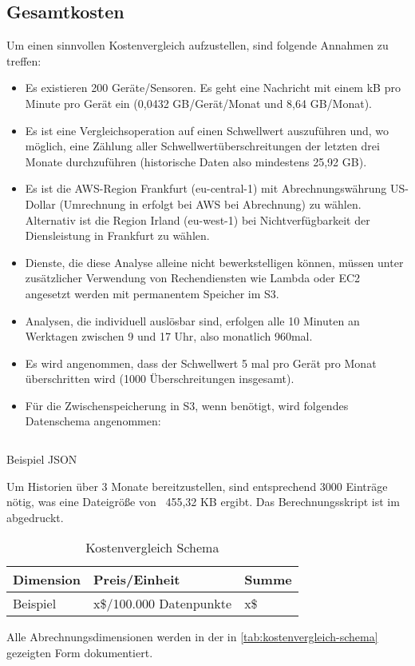 \subsection{Gesamtkosten}
Um einen sinnvollen Kostenvergleich aufzustellen, sind folgende Annahmen zu treffen:

\begin{itemize}
\item Es existieren 200 Geräte/Sensoren. Es geht eine Nachricht mit einem kB pro Minute pro Gerät ein (0,0432 GB/Gerät/Monat und 8,64 GB/Monat).
\item Es ist eine Vergleichsoperation auf einen Schwellwert auszuführen und, wo möglich, eine Zählung aller Schwellwertüberschreitungen der letzten drei Monate durchzuführen (historische Daten also mindestens 25,92 GB).  
\item Es ist die \ac{AWS}-Region Frankfurt (eu-central-1) mit Abrechnungswährung US-Dollar (Umrechnung in \texteuro{} erfolgt bei \ac{AWS} bei Abrechnung) zu wählen. Alternativ ist die Region Irland (eu-west-1) bei Nichtverfügbarkeit der Diensleistung in Frankfurt zu wählen. 
\item Dienste, die diese Analyse alleine nicht bewerkstelligen können, müssen unter zusätzlicher Verwendung von Rechendiensten wie Lambda oder \ac{EC2} angesetzt werden mit permanentem Speicher im \ac{S3}. 
\item Analysen, die individuell auslösbar sind, erfolgen alle 10 Minuten an Werktagen zwischen 9 und 17 Uhr, also monatlich 960mal. 
\item Es wird angenommen, dass der Schwellwert 5 mal pro Gerät pro Monat überschritten wird (1000 Überschreitungen insgesamt).
\item Für die Zwischenspeicherung in \ac{S3}, wenn benötigt, wird folgendes Datenschema angenommen:
\end{itemize}

\begin{listing}[H]
\inputminted[frame=lines,breaklines=true]{json}{code/estimates/filtered-estimate.json}
\caption[Beispiel JSON]{Beispiel \ac{JSON}}
\label{listing:json}
\end{listing}
Um Historien über 3 Monate bereitzustellen, sind entsprechend 3000 Einträge nötig, was eine Dateigröße von ~455,32 KB ergibt. Das Berechnungsskript ist im  abgedruckt.


\begin{table}[H]
\centering
\begin{tabular}{|l|l|l|}
\hline
Dimension & Preis/Einheit           & Summe \\ \hline
Beispiel  & x\$/100.000 Datenpunkte & x\$  \\\hline
\end{tabular}
\caption{Kostenvergleich Schema}
\label{tab:kostenvergleich-schema}
\end{table}
Alle Abrechnungsdimensionen werden in der in \autoref{tab:kostenvergleich-schema} gezeigten Form dokumentiert.
